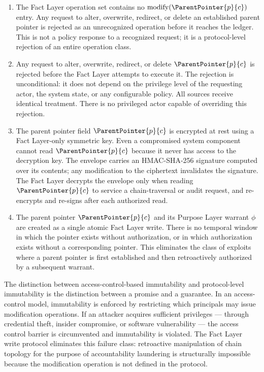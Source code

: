\begin{enumerate}
    \item[(W1) \textbf{No modification operation defined.}] The Fact Layer operation set contains no $\mathrm{modify}(\ParentPointer{p}{c})$ entry. Any request to alter, overwrite, redirect, or delete an established parent pointer is rejected as an unrecognized operation before it reaches the ledger. This is not a policy response to a recognized request; it is a protocol-level rejection of an entire operation class.

    \item[(W2) \textbf{Unconditional rejection.}] Any request to alter, overwrite, redirect, or delete $\ParentPointer{p}{c}$ is rejected before the Fact Layer attempts to execute it. The rejection is unconditional: it does not depend on the privilege level of the requesting actor, the system state, or any configurable policy. All sources receive identical treatment. There is no privileged actor capable of overriding this rejection.

    \item[(W3) \textbf{Sealed memory envelope.}] The parent pointer field $\ParentPointer{p}{c}$ is encrypted at rest using a Fact Layer-only symmetric key. Even a compromised system component cannot read $\ParentPointer{p}{c}$ because it never has access to the decryption key. The envelope carries an HMAC-SHA-256 signature computed over its contents; any modification to the ciphertext invalidates the signature. The Fact Layer decrypts the envelope only when reading $\ParentPointer{p}{c}$ to service a chain-traversal or audit request, and re-encrypts and re-signs after each authorized read.

    \item[(W4) \textbf{Atomic provisioning.}] The parent pointer $\ParentPointer{p}{c}$ and its Purpose Layer warrant $\phi$ are created as a single atomic Fact Layer write. There is no temporal window in which the pointer exists without authorization, or in which authorization exists without a corresponding pointer. This eliminates the class of exploits where a parent pointer is first established and then retroactively authorized by a subsequent warrant.
\end{enumerate}

The distinction between access-control-based immutability and protocol-level immutability is the distinction between a promise and a guarantee. In an access-control model, immutability is enforced by restricting which principals may issue modification operations. If an attacker acquires sufficient privileges — through credential theft, insider compromise, or software vulnerability — the access control barrier is circumvented and immutability is violated. The Fact Layer write protocol eliminates this failure class: retroactive manipulation of chain topology for the purpose of accountability laundering is structurally impossible because the modification operation is not defined in the protocol.

